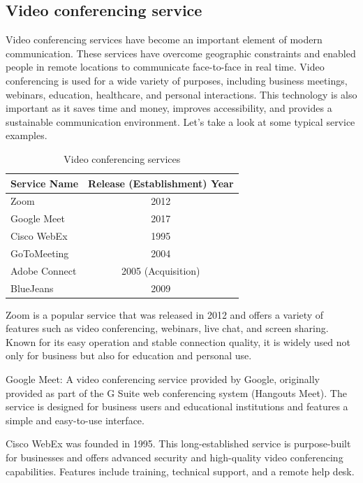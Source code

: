 \documentclass[12pt]{article}
\begin{document}
\subsection{Video conferencing service}
Video conferencing services have become an important element of modern
communication. These services have overcome geographic constraints and enabled
people in remote locations to communicate face-to-face in real time. Video
conferencing is used for a wide variety of purposes, including business
meetings, webinars, education, healthcare, and personal interactions. This
technology is also important as it saves time and money, improves
accessibility, and provides a sustainable communication environment. Let's take
a look at some typical service examples.
\begin{table}[h]
    \begin{center}
        \begin{tabular}{|l|c|} \hline
            Service Name  & Release (Establishment) Year \\ \hline
            Zoom          & 2012                         \\
            Google Meet   & 2017                         \\
            Cisco WebEx   & 1995                         \\
            GoToMeeting   & 2004                         \\
            Adobe Connect & 2005 (Acquisition)           \\
            BlueJeans     & 2009                         \\ \hline
        \end{tabular}
        \caption{Video conferencing services}
    \end{center}
\end{table}

Zoom is a popular service that was released in 2012 and offers a variety of
features such as video conferencing, webinars, live chat, and screen sharing.
Known for its easy operation and stable connection quality, it is widely used
not only for business but also for education and personal use.

Google Meet: A video conferencing service provided by Google, originally
provided as part of the G Suite web conferencing system (Hangouts Meet). The
service is designed for business users and educational institutions and
features a simple and easy-to-use interface.

Cisco WebEx was founded in 1995. This long-established service is purpose-built
for businesses and offers advanced security and high-quality video conferencing
capabilities. Features include training, technical support, and a remote help
desk.
\end{document}
